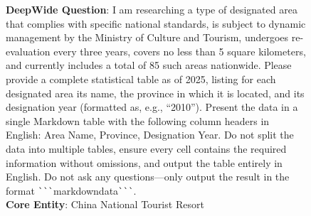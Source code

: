 \documentclass[11pt, letterpaper, logo, onecolumn, copyright, numbering]{paper_improved}
\begin{document}
\begin{figure}[htbp]
\begin{center}\end{center}\vspace{2mm}
    \begin{tcolorbox}[
        title=Input of Wide2Deep\_038 Instance,
        colback=yellow!10,
        colbacktitle=black!80,
        coltitle=white,
        arc=1mm,
        boxrule=0pt,
        breakable]
        \textbf{DeepWide Question}: I am researching a type of designated area that complies with specific national standards, is subject to dynamic management by the Ministry of Culture and Tourism, undergoes re-evaluation every three years, covers no less than 5 square kilometers, and currently includes a total of 85 such areas nationwide. Please provide a complete statistical table as of 2025, listing for each designated area its name, the province in which it is located, and its designation year (formatted as, e.g., ``2010''). Present the data in a single Markdown table with the following column headers in English: Area Name, Province, Designation Year. Do not split the data into multiple tables, ensure every cell contains the required information without omissions, and output the table entirely in English. Do not ask any questions—only output the result in the format \verb|```|markdown{data}\verb|```|.\\
        \medskip
        \textbf{Core Entity}: China National Tourist Resort
    \end{tcolorbox}
    

\end{figure}
\end{document}
